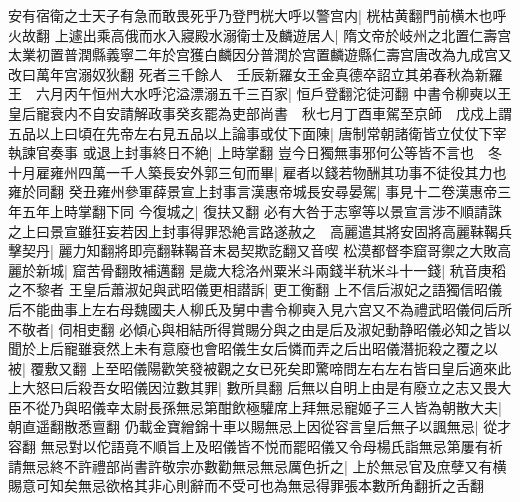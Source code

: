 安有宿衛之士天子有急而敢畏死乎乃登門桄大呼以警宫内|{
	桄枯黄翻門前横木也呼火故翻}
上遽出乘高俄而水入寢殿水溺衛士及麟遊居人|{
	隋文帝於岐州之北置仁壽宫太業初置普潤縣義寧二年於宫獲白麟因分普潤於宫置麟遊縣仁壽宫唐改為九成宫又改曰萬年宫溺奴狄翻}
死者三千餘人　壬辰新羅女王金真德卒詔立其弟春秋為新羅王　六月丙午恒州大水呼沱溢漂溺五千三百家|{
	恒戶登翻沱徒河翻}
中書令柳奭以王皇后寵衰内不自安請解政事癸亥罷為吏部尚書　秋七月丁酉車駕至京師　戊戍上謂五品以上曰頃在先帝左右見五品以上論事或仗下面陳|{
	唐制常朝諸衛皆立仗仗下宰執諫官奏事}
或退上封事終日不絶|{
	上時掌翻}
豈今日獨無事邪何公等皆不言也　冬十月雇雍州四萬一千人築長安外郭三旬而畢|{
	雇者以錢若物酬其功事不徒役其力也雍於同翻}
癸丑雍州參軍薛景宣上封事言漢惠帝城長安尋晏駕|{
	事見十二卷漢惠帝三年五年上時掌翻下同}
今復城之|{
	復扶又翻}
必有大咎于志寧等以景宣言涉不順請誅之上曰景宣雖狂妄若因上封事得罪恐絶言路遂赦之　高麗遣其將安固將高麗靺鞨兵擊契丹|{
	麗力知翻將即亮翻靺鞨音末曷契欺訖翻又音喫}
松漠都督李窟哥禦之大敗高麗於新城|{
	窟苦骨翻敗補邁翻}
是歲大稔洛州粟米斗兩錢半秔米斗十一錢|{
	秔音庚稻之不黎者}
王皇后蕭淑妃與武昭儀更相譛訴|{
	更工衡翻}
上不信后淑妃之語獨信昭儀后不能曲事上左右母魏國夫人柳氏及舅中書令柳奭入見六宫又不為禮武昭儀伺后所不敬者|{
	伺相吏翻}
必傾心與相結所得賞賜分與之由是后及淑妃動静昭儀必知之皆以聞於上后寵雖衰然上未有意廢也會昭儀生女后憐而弄之后出昭儀潛扼殺之覆之以被|{
	覆敷又翻}
上至昭儀陽歡笑發被觀之女已死矣即驚啼問左右左右皆曰皇后適來此上大怒曰后殺吾女昭儀因泣數其罪|{
	數所具翻}
后無以自明上由是有廢立之志又畏大臣不從乃與昭儀幸太尉長孫無忌第酣飲極驩席上拜無忌寵姬子三人皆為朝散大夫|{
	朝直遥翻散悉亶翻}
仍載金寶繒錦十車以賜無忌上因從容言皇后無子以諷無忌|{
	從才容翻}
無忌對以佗語竟不順旨上及昭儀皆不悦而罷昭儀又令母楊氏詣無忌第屢有祈請無忌終不許禮部尚書許敬宗亦數勸無忌無忌厲色折之|{
	上於無忌官及庶孽又有横賜意可知矣無忌欲格其非心則辭而不受可也為無忌得罪張本數所角翻折之舌翻}


